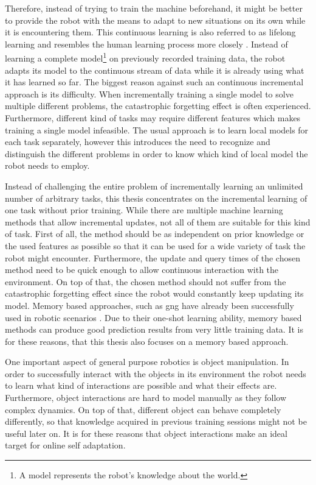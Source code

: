 Therefore, instead of trying to train the machine beforehand, it might be better to provide the robot with the means to adapt to new situations on its own while it is encountering them. 
This continuous learning is also referred to as lifelong learning and resembles the human learning process more closely \cite{silver2013lifelong}.
Instead of learning a complete model\footnote{A model represents the robot's knowledge about the world.} on previously recorded training data, the robot adapts its model to the continuous stream of data while it is already using what it has learned so far. 
The biggest reason against such an continuous incremental approach is its difficulty. When incrementally training a single model to solve multiple different problems, the catastrophic forgetting effect is often experienced. Furthermore, different kind of tasks may require different features which makes training a single model infeasible. The usual approach is to learn local models for each task separately, however this introduces the need to recognize and distinguish the different problems in order to know which kind of local model the robot needs to employ.

Instead of challenging the entire problem of incrementally learning an unlimited number of arbitrary tasks, this thesis concentrates on the incremental learning of one task without prior training. 
While there are multiple machine learning methods that allow incremental updates, not all of them are suitable for this kind of task. 
First of all, the method should be as independent on prior knowledge or the used features as possible so that it can be used for a wide variety of task the robot might encounter. Furthermore, the update and query times of the chosen method need to be quick enough to allow continuous interaction with the environment. On top of that, the chosen method should not suffer from the catastrophic forgetting effect since the robot would constantly keep updating its model. Memory based approaches, such as \gls{gng} have already been successfully used in robotic scenarios \cite{carlevarino2000incremental}. Due to their one-shot learning ability, memory based methods can produce good prediction results from very little training data. It is for these reasons, that this thesis also focuses on a memory based approach. 

One important aspect of general purpose robotics is object manipulation. In order to successfully interact with the objects in its environment the robot needs to learn what kind of interactions are possible and what their effects are. 
Furthermore, object interactions are hard to model manually as they follow complex dynamics. On top of that, different object can behave completely differently, so that knowledge acquired in previous training sessions might not be useful later on. It is for these reasons that object interactions make an ideal target for online self adaptation. 

